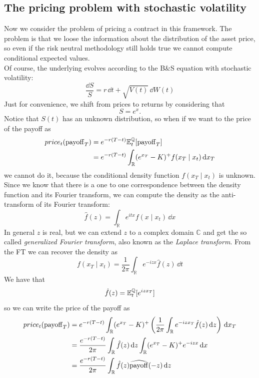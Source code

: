 \subsection{The pricing problem with stochastic volatility}
Now we consider the problem of pricing a contract in this framework. The problem is that we loose the information about the distribution of the asset price, so even if the risk neutral methodology still holds true we cannot compute conditional expected values.\\
Of course, the underlying evolves according to the B\&S equation with stochastic volatility:
\begin{equation}
    \frac{\dd S}{S} = r\,\dd t + \sqrt{V(t)}\,\dd W(t)
\end{equation}
Just for convenience, we shift from prices to returns by considering that
\begin{equation*}
    S = e^x.
\end{equation*}
Notice that $S(t)$ has an unknown distribution, so when if we want to the price of the payoff as
\begin{align*}
    price_t(\operatorname{payoff}_T) &= e^{-r(T-t)}\mathbb{E}^{\mathbb{Q}}_t[\operatorname{payoff}_T] \\
    &=
    e^{-r(T-t)}\int_{\mathbb{R}}(e^{x_T}-K)^+ f(x_T \mid x_t)\,\dd x_T
\end{align*}
we cannot do it, because the conditional density function $f(x_T\mid x_t)$ is unknown. Since we know that there is a one to one correspondence between the density function and its Fourier transform, we can compute the density as the anti-transform of its Fourier transform:
\begin{equation*}
    \hat{f}(z) = \int_{\mathbb{R}}e^{itx}f(x\mid x_t)\,\dd x
\end{equation*}
In general $z$ is real, but we can extend $z$ to a complex domain $\mathbb{C}$ and get the so called \emph{generalized Fourier transform}, also known as the \emph{Laplace transform}. From the FT we can recover the density as
\begin{equation*}
    f(x_T\mid x_t) = \frac{1}{2\pi}\int_{\mathbb{R}}e^{-izx}\hat{f}(z)\,\dd t
\end{equation*}
We have that
\begin{equation*}
    \hat{f}(z) = \mathbb{E}^{\mathbb{Q}}_t[e^{izx_T}]
\end{equation*}
so we can write the price of the payoff as
\begin{align*}
    price_t(\operatorname{payoff}_T) &= e^{-r(T-t)}\int_{\mathbb{R}}(e^{x_T}-K)^+ \left(\frac{1}{2\pi}\int_{\mathbb{R}}e^{-izx_T}\hat{f}(z)\,\dd z\right)\,\dd x_T \\
    &=
    \frac{e^{-r(T-t)}}{2\pi}\int_{\mathbb{R}}\hat{f}(z)\,\dd z \int_{\mathbb{R}}(e^{x_T}-K)^+e^{-izx}\,\dd x \\
    &=
    \frac{e^{-r(T-t)}}{2\pi}\int_{\mathbb{R}}\hat{f}(z)\widehat{\operatorname{payoff}}(-z)\,\dd z
\end{align*}
